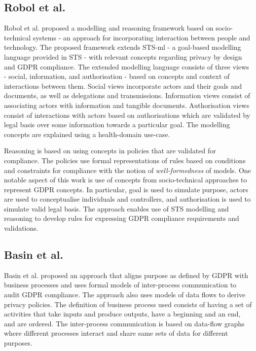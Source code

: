 \subsection*{Robol et al.}
Robol et al. \cite{robol_toward_2017} proposed a modelling and reasoning framework based on socio-technical systems \cite{dalpiaz_security_2016} - an approach for incorporating interaction between people and technology. The proposed framework extends STS-ml - a goal-based modelling language provided in STS - with relevant concepts regarding privacy by design and GDPR compliance. The extended modelling language consists of three views - social, information, and authorisation - based on concepts and context of interactions between them. Social views incorporate actors and their goals and documents, as well as delegations and transmissions. Information views consist of associating actors with information and tangible documents. Authorisation views consist of interactions with actors based on authorisations which are validated by legal basis over some information towards a particular goal. The modelling concepts are explained using a health-domain use-case.

Reasoning is based on using concepts in policies that are validated for compliance. The policies use formal representations of rules based on conditions and constraints for compliance with the notion of \textit{well-formedness} of models. One notable aspect of this work is use of concepts from socio-technical approaches to represent GDPR concepts. In particular, goal is used to simulate purpose, actors are used to conceptualise individuals and controllers, and authorisation is used to simulate valid legal basis. The approach enables use of STS modelling and reasoning to develop rules for expressing GDPR compliance requirements and validations.

\subsection*{Basin et al.}
Basin et al. \cite{basin_purpose_2018} proposed an approach that aligns purpose as defined by GDPR with business processes and uses formal models of inter-process communication to audit GDPR compliance. The approach also uses models of data flows to derive privacy policies. 
The definition of business process used consists of having a set of activities that take inputs and produce outputs, have a beginning and an end, and are ordered. The inter-process communication is based on data-flow graphs where different processes interact and share same sets of data for different purposes.

